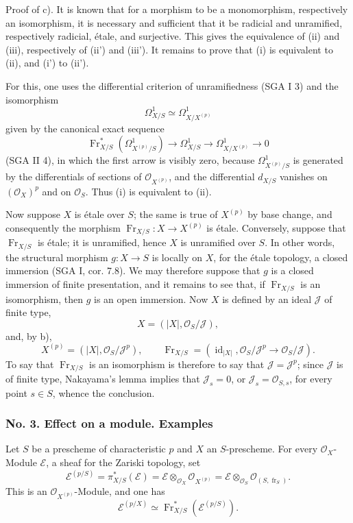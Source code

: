 \documentclass[11pt]{article}
\providecommand{\OO}{\mathcal{O}}
\providecommand{\id}{\operatorname{id}}
\providecommand{\cE}{\mathcal E}
\providecommand{\id}{\operatorname{id}}
\providecommand{\id}{\operatorname{id}}
\providecommand{\id}{\operatorname{id}}
\providecommand{\id}{\operatorname{id}}
\providecommand{\fr}{\operatorname{fr}}
\providecommand{\Fr}{\operatorname{Fr}}
\providecommand{\JJ}{\mathcal J}
\providecommand{\Fr}{\operatorname{Fr}}
\providecommand{\fr}{\operatorname{fr}}
\providecommand{\id}{\operatorname{id}}
\begin{document}
Proof of c). It is known that for a morphism to be a monomorphism, respectively an isomorphism, it is necessary and sufficient that it be radicial and unramified, respectively radicial, étale, and surjective. This gives the equivalence of (ii) and (iii), respectively of (ii') and (iii'). It remains to prove that (i) is equivalent to (ii), and (i') to (ii').

For this, one uses the differential criterion of unramifiedness (SGA I 3) and the isomorphism
\[
\Omega^1_{X/S}\simeq \Omega^1_{X/X^{(p)}}
\]
given by the canonical exact sequence
\[
\Fr_{X/S}^*(\Omega^1_{X^{(p)}/S})\longrightarrow \Omega^1_{X/S}
\longrightarrow \Omega^1_{X/X^{(p)}}\longrightarrow 0
\]
(SGA II 4), in which the first arrow is visibly zero, because $\Omega^1_{X^{(p)}/S}$ is generated by the differentials of sections of $\OO_{X^{(p)}}$, and the differential $d_{X/S}$ vanishes on $(\OO_X)^p$ and on $\OO_S$. Thus (i) is equivalent to (ii).

Now suppose $X$ is étale over $S$; the same is true of $X^{(p)}$ by base change, and consequently the morphism $\Fr_{X/S}:X\to X^{(p)}$ is étale. Conversely, suppose that $\Fr_{X/S}$ is étale; it is unramified, hence $X$ is unramified over $S$. In other words, the structural morphism $g:X\to S$ is locally on $X$, for the étale topology, a closed immersion (SGA I, cor. 7.8). We may therefore suppose that $g$ is a closed immersion of finite presentation, and it remains to see that, if $\Fr_{X/S}$ is an isomorphism, then $g$ is an open immersion. Now $X$ is defined by an ideal $\JJ$ of finite type,
\[
X=(|X|,\OO_S/\JJ),
\]
and, by b),
\[
X^{(p)}=(|X|,\OO_S/\JJ^p),
\qquad
\Fr_{X/S}=(\id_{|X|},\OO_S/\JJ^p\to\OO_S/\JJ).
\]
To say that $\Fr_{X/S}$ is an isomorphism is therefore to say that $\JJ=\JJ^p$; since $\JJ$ is of finite type, Nakayama's lemma implies that $\JJ_s=0$, or $\JJ_s=\OO_{S,s}$, for every point $s\in S$, whence the conclusion.

\subsubsection*{No. 3. Effect on a module. Examples}

Let $S$ be a prescheme of characteristic $p$ and $X$ an $S$-prescheme. For every $\OO_X$-Module $\cE$, a sheaf for the Zariski topology, set
\[
\cE^{(p/S)}=\pi_{X/S}^*(\cE)=\cE\otimes_{\OO_X}\OO_{X^{(p)}}
 =\cE\otimes_{\OO_S}\OO_{(S,\fr_S)}.
\]
This is an $\OO_{X^{(p)}}$-Module, and one has
\[
\cE^{(p/X)}\simeq \Fr_{X/S}^*(\cE^{(p/S)}).
\]
\end{document}
